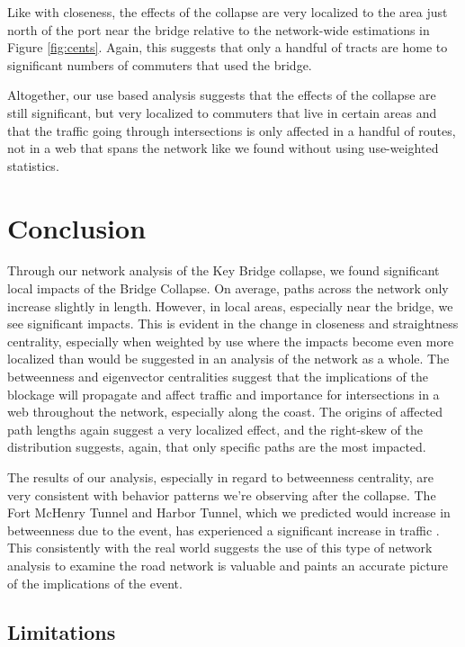 \documentclass[11pt]{article}
\numberwithin{equation}{section} %
\numberwithin{figure}{section} %
\numberwithin{table}{section} %
\theoremstyle{definition}
\begin{document}
Like with closeness, the effects of the collapse are very localized to the area just north of the port near the bridge relative to the network-wide estimations in Figure \ref{fig:cents}. Again, this suggests that only a handful of tracts are home to significant numbers of commuters that used the bridge.

Altogether, our use based analysis suggests that the effects of the collapse are still significant, but very localized to commuters that live in certain areas and that the traffic going through intersections is only affected in a handful of routes, not in a web that spans the network like we found without using use-weighted statistics.


\section{Conclusion} \label{sec:concl}

Through our network analysis of the Key Bridge collapse, we found significant local impacts of the Bridge Collapse. On average, paths across the network only increase slightly in length. However, in local areas, especially near the bridge, we see significant impacts. This is evident in the change in closeness and straightness centrality, especially when weighted by use where the impacts become even more localized than would be suggested in an analysis of the network as a whole. The betweenness and eigenvector centralities suggest that the implications of the blockage will propagate and affect traffic and importance for intersections in a web throughout the network, especially along the coast. The origins of affected path lengths again suggest a very localized effect, and the right-skew of the distribution suggests, again, that only specific paths are the most impacted.

The results of our analysis, especially in regard to betweenness centrality, are very consistent with behavior patterns we're observing after the collapse. The Fort McHenry Tunnel and Harbor Tunnel, which we predicted would increase in betweenness due to the event, has experienced a significant increase in traffic \parencite{Domen24}. This consistently with the real world suggests the use of this type of network analysis to examine the road network is valuable and paints an accurate picture of the implications of the event.


\subsection{Limitations}
\end{document}
